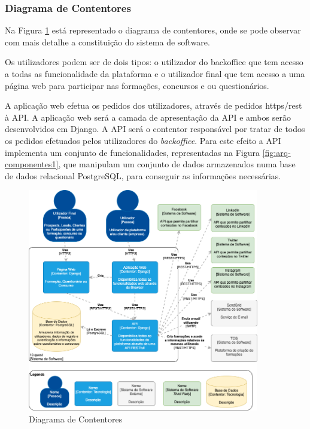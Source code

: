 \subsubsection{Diagrama de Contentores}

Na Figura \ref{fig:arq-contentores} está representado o diagrama de contentores, onde se pode observar com mais detalhe a constituição do sistema de software.

Os utilizadores podem ser de dois tipos: o utilizador do backoffice que tem acesso a todas as funcionalidade da plataforma e o utilizador final que tem acesso a uma página web para participar nas formações, concursos e ou questionários.

A aplicação web efetua os pedidos dos utilizadores, através de pedidos \acrshort{https}/\acrshort{rest} à API. A aplicação web será a camada de apresentação da API e ambos serão desenvolvidos em Django. A API será o contentor responsável por tratar de todos os pedidos efetuados pelos utilizadores do \textit{backoffice}. Para este efeito a API implementa um conjunto de funcionalidades, representadas na Figura \ref{fig:arq-componentes1}, que manipulam um conjunto de dados armazenados numa base de dados relacional PostgreSQL, para conseguir as informações necessárias.
\newpage

\begin{figure}[ht!]
	\begin{center}
		\includegraphics[width=0.9\textwidth]{img/arq/diagrama-contentores}
		\caption{Diagrama de Contentores}
		\label{fig:arq-contentores}
	\end{center}
\end{figure}

